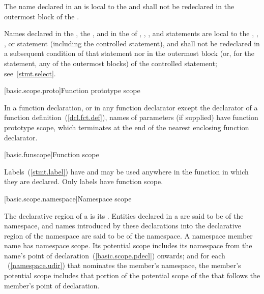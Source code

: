 \pnum
{}%
The name declared in an 
is local to the
 and shall not be redeclared in the outermost block of the
.

\pnum
Names declared in the , the , and in the
 of , , , and
 statements are local to the , ,
, or  statement (including the controlled
statement), and shall not be redeclared in a subsequent condition of
that statement nor in the outermost block (or, for the 
statement, any of the outermost blocks) of the controlled statement;
see~\ref{stmt.select}.

[basic.scope.proto]{Function prototype scope}

\pnum
{}%
%
In a function declaration, or in any function declarator except the
declarator of a function definition~(\ref{dcl.fct.def}), names of
parameters (if supplied) have function prototype scope, which terminates
at the end of the nearest enclosing function declarator.

[basic.funscope]{Function scope}

\pnum
{}%
%
Labels~(\ref{stmt.label}) have  and
may be used anywhere in the function in which they are declared. Only
labels have function scope.

[basic.scope.namespace]{Namespace scope}

\pnum
{}%
The declarative region of a  is its
.  Entities declared in a
 are said to be  of the
namespace, and names introduced by these declarations into the
declarative region of the namespace are said to be  of the namespace. A namespace member name has namespace scope.
Its potential scope includes its namespace from the name's point of
declaration~(\ref{basic.scope.pdecl}) onwards; and for each
~(\ref{namespace.udir}) that nominates the
member's namespace, the member's potential scope includes that portion
of the potential scope of the  that follows
the member's point of declaration. \enterexample

